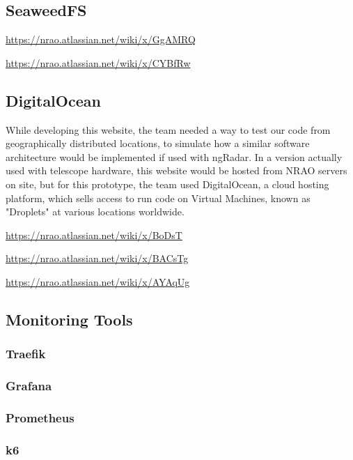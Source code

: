 \documentclass[12pt]{article}
\begin{document}
\subsection*{SeaweedFS}

\url{https://nrao.atlassian.net/wiki/x/GgAMRQ}

\url{https://nrao.atlassian.net/wiki/x/CYBfRw}

\subsection*{DigitalOcean}

  While developing this website, the team needed a way to test our code from geographically distributed locations, to simulate how a similar software architecture would be implemented if used with ngRadar. In a version actually used with telescope hardware, this website would be hosted from NRAO servers on site, but for this prototype, the team used DigitalOcean, a cloud hosting platform, which sells access to run code on Virtual Machines, known as "Droplets" at various locations worldwide. 

\url{https://nrao.atlassian.net/wiki/x/BoDsT}

\url{https://nrao.atlassian.net/wiki/x/BACsTg}

\url{https://nrao.atlassian.net/wiki/x/AYAqUg}


\subsection*{Monitoring Tools}

\subsubsection*{Traefik}



\subsubsection*{Grafana}



\subsubsection*{Prometheus}



\subsubsection*{k6}
\end{document}
